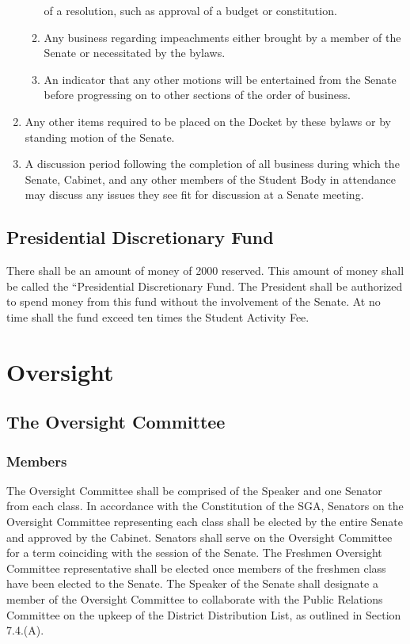 \documentclass[12pt]{scrreprt}
\begin{document}
\begin{enumerate}
\begin{enumerate}
                  of a resolution, such as approval of a budget or 
                  constitution. 
            \item Any business regarding impeachments either brought by a 
                  member of the Senate or necessitated by the bylaws. 
            \item An indicator that any other motions will be entertained from 
                  the Senate before progressing on to other sections of the 
                  order of business. 
        \end{enumerate}
    \item Any other items required to be placed on the Docket by these bylaws 
          or by standing motion of the Senate.
    \item A discussion period following the completion of all business during which the Senate, Cabinet, and any other members of the Student Body in attendance may discuss any issues they see fit for discussion at a Senate meeting.
\end{enumerate}

\section{Presidential Discretionary Fund}
There shall be an amount of money of 2000 reserved. This amount of money shall be called the “Presidential Discretionary Fund. The President shall be authorized to spend money from this fund without the involvement of the Senate. At no time shall the fund exceed ten times the Student Activity Fee. 

\chapter{Oversight}

\section{The Oversight Committee}

\subsection{Members} \label{sec:oversight_membership}
The Oversight Committee shall be comprised of the Speaker and one Senator from 
each class. In accordance with the Constitution of the SGA, Senators on the Oversight Committee representing each class shall be elected by the entire Senate and approved by the Cabinet. Senators shall serve on the Oversight Committee for a term coinciding with the session of the 
Senate. The Freshmen Oversight Committee representative shall be elected once members of the freshmen class have been elected to the Senate. The Speaker of the Senate shall designate a member of the Oversight Committee to collaborate with the Public Relations Committee on the upkeep of the District Distribution List, as outlined in Section 7.4.(A).
\end{document}
